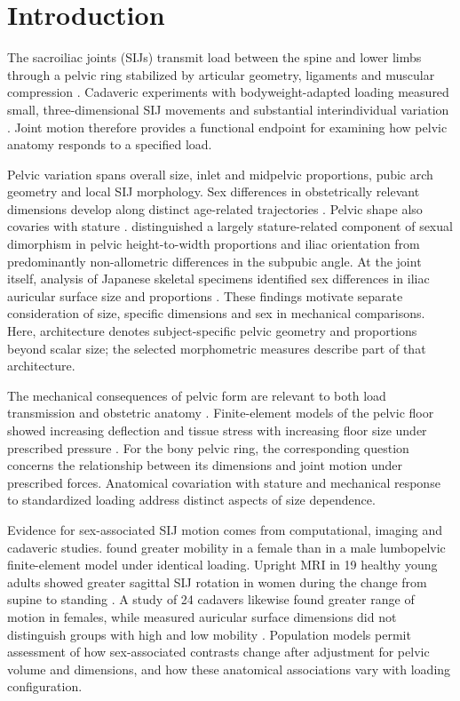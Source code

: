\section{Introduction}
The sacroiliac joints (SIJs) transmit load between the spine and lower limbs through a pelvic ring stabilized by articular geometry, ligaments and muscular compression \citep{Snijders1993,Vleeming2012,Hammer2013}. Cadaveric experiments with bodyweight-adapted loading measured small, three-dimensional SIJ movements and substantial interindividual variation \citep{Hammer2019}. Joint motion therefore provides a functional endpoint for examining how pelvic anatomy responds to a specified load.

Pelvic variation spans overall size, inlet and midpelvic proportions, pubic arch geometry and local SIJ morphology. Sex differences in obstetrically relevant dimensions develop along distinct age-related trajectories \citep{Huseynov2016}. Pelvic shape also covaries with stature \citep{Fischer2015}. \citet{Fischer2017} distinguished a largely stature-related component of sexual dimorphism in pelvic height-to-width proportions and iliac orientation from predominantly non-allometric differences in the subpubic angle. At the joint itself, analysis of Japanese skeletal specimens identified sex differences in iliac auricular surface size and proportions \citep{Nishi2020}. These findings motivate separate consideration of size, specific dimensions and sex in mechanical comparisons. Here, architecture denotes subject-specific pelvic geometry and proportions beyond scalar size; the selected morphometric measures describe part of that architecture.

The mechanical consequences of pelvic form are relevant to both load transmission and obstetric anatomy \citep{Pavlicev2020}. Finite-element models of the pelvic floor showed increasing deflection and tissue stress with increasing floor size under prescribed pressure \citep{Stansfield2021}. For the bony pelvic ring, the corresponding question concerns the relationship between its dimensions and joint motion under prescribed forces. Anatomical covariation with stature and mechanical response to standardized loading address distinct aspects of size dependence.

Evidence for sex-associated SIJ motion comes from computational, imaging and cadaveric studies. \citet{Joukar2018} found greater mobility in a female than in a male lumbopelvic finite-element model under identical loading. Upright MRI in 19 healthy young adults showed greater sagittal SIJ rotation in women during the change from supine to standing \citep{Tani2023}. A study of 24 cadavers likewise found greater range of motion in females, while measured auricular surface dimensions did not distinguish groups with high and low mobility \citep{Shin2024}. Population models permit assessment of how sex-associated contrasts change after adjustment for pelvic volume and dimensions, and how these anatomical associations vary with loading configuration.

